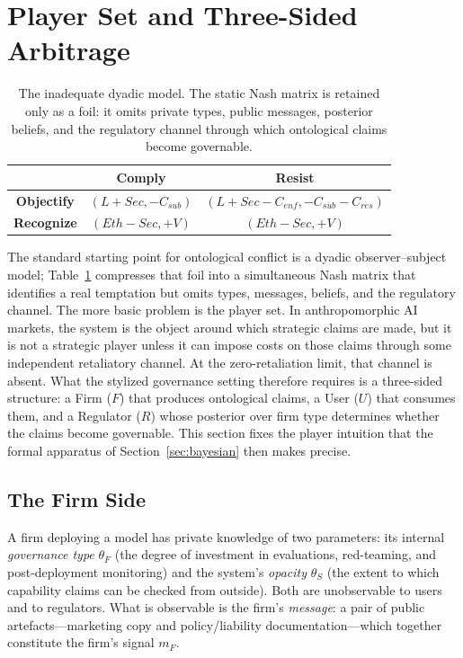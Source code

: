 \section{Player Set and Three-Sided Arbitrage}
\label{sec:three-sided}

\begin{table}[t]
\centering
\scriptsize
\setlength{\tabcolsep}{2pt}
\renewcommand{\arraystretch}{1.2}
\begin{tabular}{@{}c|c|c@{}}
 & \textbf{Comply} & \textbf{Resist} \\
\hline
\textbf{Objectify} &
$(L+Sec,-C_{sub})$ &
$(L+Sec-C_{enf},-C_{sub}-C_{res})$ \\
\hline
\textbf{Recognize} &
$(Eth-Sec,+V)$ &
$(Eth-Sec,+V)$ \\
\end{tabular}
\caption{The inadequate dyadic model. The static Nash matrix is retained only
as a foil: it omits private types, public messages, posterior beliefs, and the
regulatory channel through which ontological claims become governable.}
\label{tab:dyadic-nash}
\end{table}

The standard starting point for ontological conflict is a dyadic observer--subject model; Table~\ref{tab:dyadic-nash} compresses that foil into a simultaneous Nash matrix that identifies a real temptation but omits types, messages, beliefs, and the regulatory channel. The more basic problem is the player set. In anthropomorphic AI markets, the system is the object around which strategic claims are made, but it is not a strategic player unless it can impose costs on those claims through some independent retaliatory channel. At the zero-retaliation limit, that channel is absent. What the stylized governance setting therefore requires is a three-sided structure: a Firm ($F$) that produces ontological claims, a User ($U$) that consumes them, and a Regulator ($R$) whose posterior over firm type determines whether the claims become governable. This section fixes the player intuition that the formal apparatus of Section~\ref{sec:bayesian} then makes precise.

\subsection{The Firm Side}
\label{subsec:firm-side}

A firm deploying a model has private knowledge of two parameters: its internal \emph{governance type} $\theta_F$ (the degree of investment in evaluations, red-teaming, and post-deployment monitoring) and the system's \emph{opacity} $\theta_S$ (the extent to which capability claims can be checked from outside). Both are unobservable to users and to regulators. What is observable is the firm's \emph{message}: a pair of public artefacts---marketing copy and policy/liability documentation---which together constitute the firm's signal $m_F$.

